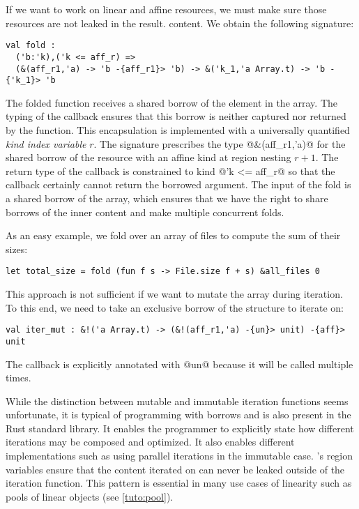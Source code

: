 If we want to work on linear and affine resources,
we must make sure those resources are not leaked in the result.
content. We obtain the following signature:
\begin{lstlisting}
val fold :
  ('b:'k),('k <= aff_r) =>
  (&(aff_r1,'a) -> 'b -{aff_r1}> 'b) -> &('k_1,'a Array.t) -> 'b -{'k_1}> 'b
\end{lstlisting}

The folded function receives a shared borrow of the element in the array.
The typing of the callback ensures
that this borrow is neither captured nor returned by the function.
%
This encapsulation is implemented with a universally quantified \emph{kind index variable} $r$.
The signature prescribes the type @&(aff_r1,'a)@ for the
shared borrow of the resource with an affine kind at region nesting $r+1$. The return
type of the callback is constrained to kind @'k <= aff_r@
so that the callback certainly cannot return the borrowed argument.
%
The input of the fold is a shared borrow of the array,
which ensures that we have the right to share borrows of the inner content and
make multiple concurrent folds.

As an easy example, we fold over an array of files to compute the sum of their sizes:
\begin{lstlisting}
let total_size = fold (fun f s -> File.size f + s) &all_files 0
\end{lstlisting}

This approach is not sufficient if we want to mutate the array during iteration.
To this end, we need to take an exclusive borrow of the structure to iterate
on:
\begin{lstlisting}
val iter_mut : &!('a Array.t) -> (&!(aff_r1,'a) -{un}> unit) -{aff}> unit
\end{lstlisting}

The callback is explicitly annotated with @un@ because  it will be called multiple times.

While the distinction between mutable and immutable iteration functions
seems unfortunate, it is typical of
programming with borrows and is also present in the Rust standard library.
It enables the programmer to explicitly state how different iterations
may be composed and optimized.
It also enables different implementations such as
using parallel iterations in the immutable case.
\lang's region variables ensure that the content iterated on can never
be leaked outside of the iteration function.
This pattern is essential in many use cases of linearity such
as pools of linear objects (see \cref{tuto:pool}).

\lstDeleteShortInline@

